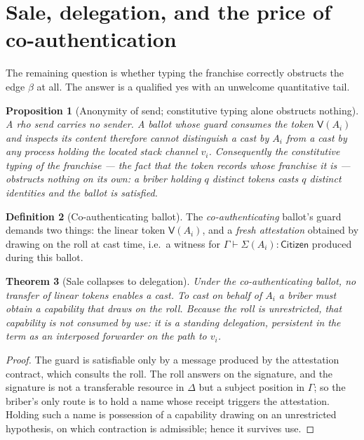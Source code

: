 \documentclass[11pt]{article}
\theoremstyle{plain}
\newtheorem{theorem}{Theorem}[section]
\newtheorem{proposition}[theorem]{Proposition}
\theoremstyle{definition}
\newtheorem{definition}[theorem]{Definition}
\theoremstyle{remark}
\newcommand{\Sig}{\Sigma}
\newcommand{\Vt}{\mathsf{V}}
\newcommand{\Cit}{\mathsf{Citizen}}
\begin{document}
\section{Sale, delegation, and the price of co-authentication}
\label{sec:sale}

The remaining question is whether typing the franchise correctly obstructs the
edge $\beta$ at all. The answer is a qualified yes with an unwelcome
quantitative tail.

\begin{proposition}[Anonymity of send; constitutive typing alone obstructs nothing]
\label{prop:anon}
A rho send carries no sender. A ballot whose guard consumes the token
$\Vt(A_i)$ and inspects its content therefore cannot distinguish a cast by
$A_i$ from a cast by any process holding the located stack channel $v_i$.
Consequently the constitutive \emph{typing} of the franchise --- the fact that
the token records whose franchise it is --- obstructs nothing on its own: a
briber holding $q$ distinct tokens casts $q$ distinct identities and the ballot
is satisfied.
\end{proposition}

\begin{definition}[Co-authenticating ballot]
The \emph{co-authenticating} ballot's guard demands two things: the linear token
$\Vt(A_i)$, and a \emph{fresh attestation} obtained by drawing on the roll at
cast time, i.e.\ a witness for $\Gamma \vdash \Sig(A_i) : \Cit$ produced during
this ballot.
\end{definition}

\begin{theorem}[Sale collapses to delegation]
\label{thm:collapse}
Under the co-authenticating ballot, no transfer of linear tokens enables a cast.
To cast on behalf of $A_i$ a briber must obtain a capability that draws on the
roll. Because the roll is unrestricted, that capability is not consumed by use:
it is a \emph{standing delegation}, persistent in the term as an interposed
forwarder on the path to $v_i$.
\end{theorem}

\begin{proof}
The guard is satisfiable only by a message produced by the attestation contract,
which consults the roll. The roll answers on the signature, and the signature is
not a transferable resource in $\Delta$ but a subject position in $\Gamma$; so
the briber's only route is to hold a name whose receipt triggers the
attestation. Holding such a name is possession of a capability drawing on an
unrestricted hypothesis, on which contraction is admissible; hence it survives
use.
\end{proof}
\end{document}

